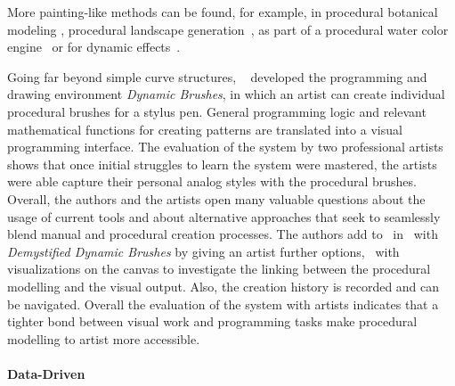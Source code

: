More painting-like methods can be found, for example, in procedural botanical modeling \cite{anastacio_2008_spl,chen_2008_stm,palubicki_2009_sot}, procedural landscape generation~\cite{emilien_2015_wie}, as part of a procedural water color engine~\cite{diverdi_2013_ppp} or for dynamic effects~\cite{xing_2016_eit}. 

Going far beyond simple curve structures, \citeauthor*{jacobs_2018_dbe}~\cite{jacobs_2018_dbe} developed the programming and drawing environment \textit{Dynamic Brushes}, in which an artist can create individual procedural brushes for a stylus pen. General programming logic and relevant mathematical functions for creating patterns are translated into a visual programming interface. The evaluation of the system by two professional artists shows that once initial struggles to learn the system were mastered, the artists were able capture their personal analog styles with the procedural brushes. Overall, the authors and the artists open many valuable questions about the usage of current tools and about alternative approaches that seek to seamlessly blend manual and procedural creation processes. The authors add to~\cite{jacobs_2018_dbe} in~\cite{li_2020_sva} with \textit{Demystified Dynamic Brushes} by giving an artist further options, \eg~with visualizations on the canvas to investigate the linking between the procedural modelling and the visual output. Also, the creation history is recorded and can be navigated. Overall the evaluation of the system with artists indicates that a tighter bond between visual work and programming tasks make procedural modelling to artist more accessible.

\paragraph*{Data-Driven}
\label{para:analysis_curves_datadriven}



